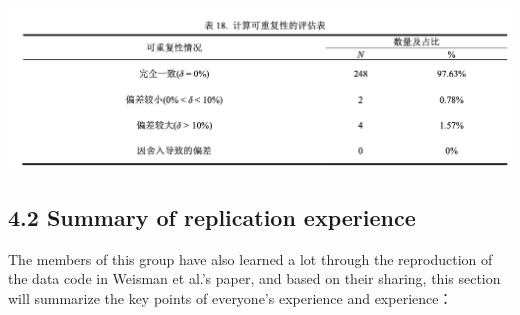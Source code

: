 \documentclass[
  man]{apa6}
\begin{document}
\includegraphics{./Script_Re_Weisman_2021_Group1_2024_files/Repeatability_figures/table18.png}

\hypertarget{summary-of-replication-experience}{%
\subsection{4.2 Summary of replication experience}\label{summary-of-replication-experience}}

The members of this group have also learned a lot through the reproduction of the data code in Weisman et al.'s paper, and based on their sharing, this section will summarize the key points of everyone's experience and experience：
\end{document}
